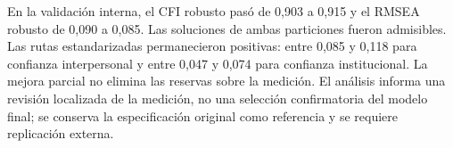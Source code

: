 En la validación interna, el CFI robusto pasó de 0,903 a 0,915 y el RMSEA robusto de 0,090 a 0,085. Las soluciones de ambas particiones fueron admisibles. Las rutas estandarizadas permanecieron positivas: entre 0,085 y 0,118 para confianza interpersonal y entre 0,047 y 0,074 para confianza institucional. La mejora parcial no elimina las reservas sobre la medición. El análisis informa una revisión localizada de la medición, no una selección confirmatoria del modelo final; se conserva la especificación original como referencia y se requiere replicación externa.
